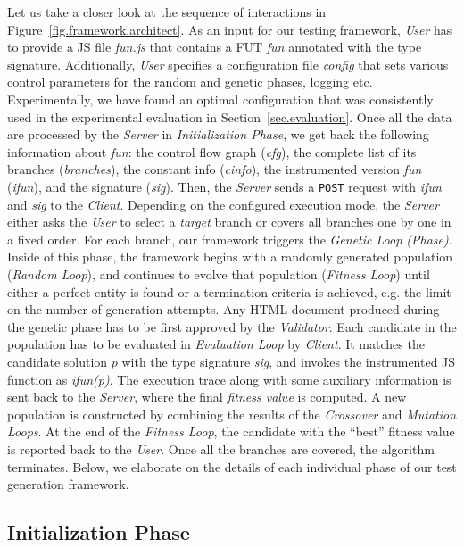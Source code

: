 \documentclass[sigconf,review]{acmart}
\newcommand{\Server}{\emph{Server}\xspace}
\newcommand{\Client}{\emph{Client}\xspace}
\newcommand{\User}{\emph{User}\xspace}
\newcommand{\Validator}{\emph{Validator}\xspace}
\begin{document}
Let us take a closer look at the sequence of interactions in Figure~\ref{fig.framework.architect}. As an input for our testing framework, \User has to provide a JS file \emph{fun.js} that contains a FUT \emph{fun} annotated with the type signature. Additionally, \User specifies a configuration file \emph{config} that sets various control parameters for the random and genetic phases, logging etc. Experimentally, we have found an optimal configuration that was consistently used in the experimental evaluation in Section~\ref{sec.evaluation}. Once all the data are processed by the \Server in \emph{Initialization Phase}, we get back the following information about \emph{fun}: the control flow graph (\emph{cfg}), the complete list of its branches (\emph{branches}), the constant info (\emph{cinfo}), the instrumented version \emph{fun} (\emph{ifun}), and the signature (\emph{sig}). Then, the \Server sends a \texttt{POST} request with \emph{ifun} and \emph{sig} to the \Client. Depending on the configured execution mode, the \Server either asks the \User to select a \emph{target} branch or covers all branches one by one in a fixed order. For each branch, our framework triggers the \emph{Genetic Loop (Phase)}. Inside of this phase, the framework begins with a randomly generated population (\emph{Random Loop}), and continues to evolve that population (\emph{Fitness Loop}) until either a perfect entity is found or a termination criteria is achieved, e.g. the limit on the number of generation attempts. Any HTML document produced during the genetic phase has to be first approved by the \Validator. Each candidate in the population has to be evaluated in \emph{Evaluation Loop} by \Client. It matches the candidate solution $p$ with the type signature \emph{sig}, and invokes the instrumented JS function as \emph{ifun(p)}. The execution trace along with some auxiliary information is sent back to the \Server, where the final \emph{fitness value} is computed. A new population is constructed by combining the results of the \emph{Crossover} and \emph{Mutation Loops}. At the end of the \emph{Fitness Loop}, the candidate with the ``best'' fitness value is reported back to the \User. Once all the branches are covered, the algorithm terminates. Below, we elaborate on the details of each individual phase of our test generation framework.

\subsection{Initialization Phase}
\label{sub.sec.init.phase}
\end{document}
